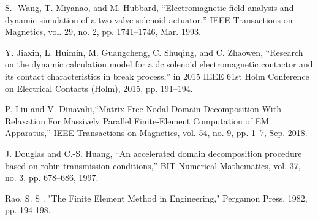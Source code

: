 \documentclass[journal,transmag]{IEEEtran}
\begin{document}
\begin{thebibliography}{1}
S.- Wang, T. Miyanao, and M. Hubbard, “Electromagnetic field analysis and dynamic simulation of a two-valve solenoid actuator,” IEEE Transactions on Magnetics, vol. 29, no. 2, pp. 1741–1746, Mar. 1993.

Y. Jiaxin, L. Huimin, M. Guangcheng, C. Shuqing, and C. Zhaowen, “Research on the dynamic calculation model for a dc solenoid electromagnetic contactor and its contact characteristics in break process,” in 2015 IEEE 61st Holm Conference on Electrical Contacts (Holm), 2015, pp. 191–194.
	

P. Liu and V. Dinavahi,``Matrix-Free Nodal Domain Decomposition With Relaxation For Massively Parallel Finite-Element Computation of EM Apparatus,” IEEE Transactions on Magnetics, vol. 54, no. 9, pp. 1–7, Sep. 2018.

J. Douglas and C.-S. Huang, “An accelerated domain decomposition procedure based on robin transmission conditions,” BIT Numerical Mathematics, vol. 37, no. 3, pp. 678–686, 1997.

Rao, S. S . "The Finite Element Method in Engineering," Pergamon Press, 1982, pp. 194-198.

\end{thebibliography}
\end{document}
